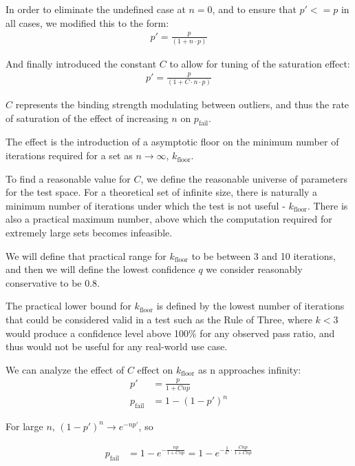 In order to eliminate the undefined case at $n = 0$, and to ensure that $p' <= p$ in all cases, we modified this to the form:
\begin{align}
    p' = \frac{p}{(1 + n \cdot p)}
\end{align}

And finally introduced the constant $C$ to allow for tuning of the saturation effect:
\begin{align}
    p' = \frac{p}{(1 + C \cdot n \cdot p)}
\end{align}

$C$ represents the binding strength modulating between outliers, and thus the rate of saturation of the effect of increasing $n$ on $p_{\text{fail}}$.

The effect is the introduction of a asymptotic floor on the minimum number of iterations required for a set as $n \to \infty$, $k_{\text{floor}}$.

To find a reasonable value for $C$, we define the reasonable universe of parameters for the test space.
For a theoretical set of infinite size, there is naturally a minimum number of iterations under which the test is not useful - $k_{\text{floor}}$.
There is also a practical maximum number, above which the computation required for extremely large sets becomes infeasible.

We will define that practical range for $k_{\text{floor}}$ to be between 3 and 10 iterations, and then we will define the lowest confidence $q$ we consider reasonably conservative to be $0.8$.

The practical lower bound for $k_{\text{floor}}$ is defined by the lowest number of iterations that could be considered valid in a test such as the Rule of Three, where $k < 3$ would produce a confidence level above 100\% for any observed pass ratio, and thus would not be useful for any real-world use case.

We can analyze the effect of $C$ effect on $k_{\text{floor}}$ as n approaches infinity:
\begin{align}
    p' &= \frac{p}{1 + C n p} \\
    p_{\text{fail}} &= 1 - (1 - p')^n
\end{align}

For large $n$, $(1 - p')^n \to e^{-n p'}$, so

\begin{align}
    p_{\text{fail}} &= 1 - e^{- \frac{n p}{1 + C n p}} 
    = 1 - e^{-\frac{1}{C} \cdot \frac{C n p}{1 + C n p}}
\end{align}

